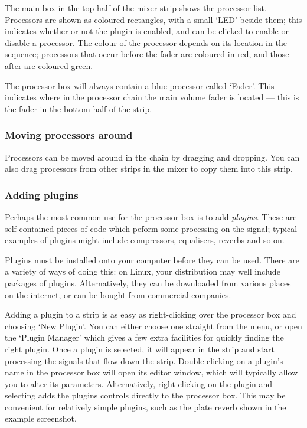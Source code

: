 \documentclass[10pt,a4paper]{book}
\newcommand{\menu}[1]{\emph{\StrSubstitute{#1}{,}{ $\rightarrow$ }}}
\begin{document}
{The main box in the top half of the mixer strip shows the processor
list.  Processors are shown as coloured rectangles, with a small `LED'
beside them; this indicates whether or not the plugin is enabled, and
can be clicked to enable or disable a processor.  The colour of the
processor depends on its location in the sequence; processors that
occur before the fader are coloured in red, and those after are
coloured green.

The processor box will always contain a blue processor called `Fader'.
This indicates where in the processor chain the main volume fader is
located --- this is the fader in the bottom half of the strip.

\subsubsection{Moving processors around}

Processors can be moved around in the chain by dragging and dropping.
You can also drag processors from other strips in the mixer to copy
them into this strip.  

\subsubsection{Adding plugins}

Perhaps the most common use for the processor box is to add
\emph{plugins}.  These are self-contained pieces of code which peform
some processing on the signal; typical examples of plugins might
include compressors, equalisers, reverbs and so on.

Plugins must be installed onto your computer before they can be used.
There are a variety of ways of doing this: on Linux, your distribution
may well include packages of plugins.  Alternatively, they can be
downloaded from various places on the internet, or can be bought from
commercial companies.


Adding a plugin to a strip is as easy as right-clicking over the
processor box and choosing `New Plugin'.  You can either choose one
straight from the menu, or open the `Plugin Manager' which gives a few
extra facilities for quickly finding the right plugin.  Once a plugin
is selected, it will appear in the strip and start processing the
signals that flow down the strip.  Double-clicking on a plugin's name
in the processor box will open its editor window, which will typically
allow you to alter its parameters.  Alternatively, right-clicking on
the plugin and selecting \menu{Controls,Show All Controls} adds the
plugins controls directly to the processor box.  This may be
convenient for relatively simple plugins, such as the plate reverb
shown in the example screenshot.

}
\end{document}
